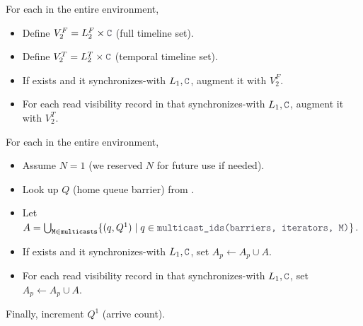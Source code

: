 \filbreak
{} For each  in the entire environment,
\begin{itemize}
  \item Define $V_2^F = L_2^F \times \lighttt{C}$ (full timeline set).
  \filbreak
  \item Define $V_2^T = L_2^T \times \lighttt{C}$ (temporal timeline set).
  \filbreak
  \item If  exists and it synchronizes-with $L_1, \lighttt{C}$, augment it with $V_2^F$.
  \filbreak
  \item For each read visibility record in  that synchronizes-with $L_1, \lighttt{C}$, augment it with $V_2^T$.
\end{itemize}

\filbreak
{} For each  in the entire environment,
\begin{itemize}
  \item Assume $N=1$ (we reserved $N$ for future use if needed).
  \filbreak
  \item Look up $Q$ (home queue barrier) from .
  \item Let $A = \bigcup_{\blacktt{M} \in \blacktt{multicasts}} \{ (q, Q^1) \mid q \in \lighttt{multicast\_ids(barriers, iterators, M)} \}$.
  \filbreak
  \item If  exists and it synchronizes-with $L_1, \lighttt{C}$, set $A_p \leftarrow A_p \cup A$.
  \filbreak
  \item For each read visibility record in  that synchronizes-with $L_1, \lighttt{C}$, set $A_p \leftarrow A_p \cup A$.
\end{itemize}
Finally, increment $Q^1$ (arrive count).

